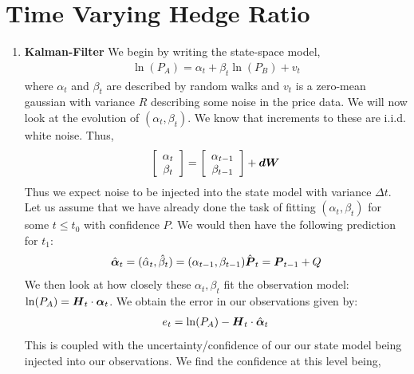 \documentclass{article}
\begin{document}
    \section{Time Varying Hedge Ratio}
    \begin{enumerate}
        \item \textbf{Kalman-Filter}
        We begin by writing the state-space model,
        \begin{gather*}
            \ln(P_A) = \alpha_t + \beta_t\ln(P_B) + v_t
        \end{gather*}
        where $\alpha_t$ and $\beta_t$ are described by random walks and $v_t$
        is a zero-mean gaussian with variance $R$ describing some noise in the
        price data. 
        We will now look at the evolution of $(\alpha_t,\beta_t)$. We know that
        increments to these are i.i.d. white noise. Thus, 
        \begin{gather*}
            \left[\begin{array}{c} \alpha_{t}\\\beta_t\end{array}\right] = 
            \left[\begin{array}{c} \alpha_{t-1}\\\beta_{t-1}\end{array}\right] +
            \boldsymbol{dW}
        \end{gather*}
        Thus we expect noise to be injected into the state model with variance $\Delta t$. Let us
        assume that we have already done the task of fitting $(\alpha_t,
        \beta_t)$ for some $t \le t_0$ with confidence $P$. We would then have the
        following prediction for $t_1$:
        \begin{gather*}
            \hat{\boldsymbol{\alpha}}_t = (\hat{\alpha}_t, \hat{\beta}_t) = (\alpha_{t-1}, \beta_{t-1})
            \hat{\boldsymbol{P}}_t = \boldsymbol{P}_{t-1} + Q
        \end{gather*}
        We then look at how closely these $\alpha_t, \beta_t$ fit the
        observation model: $\ln(P_A) = \boldsymbol{H}_t\cdot\boldsymbol{\alpha}_t$. 
        We obtain the error in our observations given by: 
        \begin{gather*}
            e_t = \ln(P_A) - \boldsymbol{H}_t\cdot\hat{\boldsymbol{\alpha}}_t
        \end{gather*}
        This is coupled with the uncertainty/confidence of our our state model
        being injected into our observations. We find the confidence at this
        level being, 
        \begin{gather*}

\end{gather*}
\end{enumerate}
\end{document}
